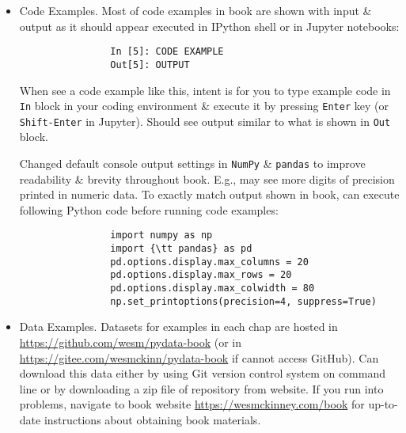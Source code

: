 \documentclass{article}
\begin{document}
\begin{itemize}
\begin{itemize}
		\begin{itemize}
			\item {\sf Code Examples.} Most of code examples in book are shown with input \& output as it should appear executed in IPython shell or in Jupyter notebooks:
			\begin{verbatim}
				In [5]: CODE EXAMPLE
				Out[5]: OUTPUT
			\end{verbatim}
			When see a code example like this, intent is for you to type example code in {\tt In} block in your coding environment \& execute it by pressing {\tt Enter} key (or {\tt Shift-Enter} in Jupyter). Should see output similar to what is shown in {\tt Out} block.
			
			Changed default console output settings in {\tt NumPy} \& {\tt pandas} to improve readability \& brevity throughout book. E.g., may see more digits of precision printed in numeric data. To exactly match output shown in book, can execute following Python code before running code examples:
			\begin{verbatim}
				import numpy as np
				import {\tt pandas} as pd
				pd.options.display.max_columns = 20
				pd.options.display.max_rows = 20
				pd.options.display.max_colwidth = 80
				np.set_printoptions(precision=4, suppress=True)
			\end{verbatim}
			\item {\sf Data Examples.} Datasets for examples in each chap are hosted in \url{https://github.com/wesm/pydata-book} (or in \url{https://gitee.com/wesmckinn/pydata-book} if cannot access GitHub). Can download this data either by using Git version control system on command line or by downloading a zip file of repository from website. If you run into problems, navigate to book website \url{https://wesmckinney.com/book} for up-to-date instructions about obtaining book materials.
			

\end{itemize}
\end{itemize}
\end{itemize}
\end{document}
